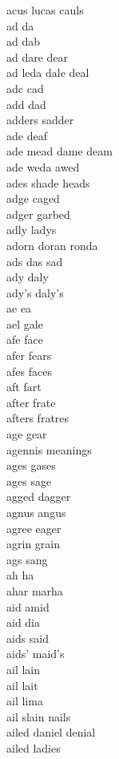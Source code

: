 acus lucas cauls \\
ad da\\
ad dab \\
ad dare dear  \\
ad leda dale deal  \\
adc cad\\
add dad\\
adders sadder\\
ade deaf \\
ade mead dame deam \\
ade weda awed \\
ades shade heads \\
adge caged \\
adger garbed \\
adly ladys \\
adorn doran ronda\\
ads das sad\\
ady daly \\
ady's daly's \\
ae ea\\
ael gale \\
afe face \\
afer fears \\
afes faces \\
aft fart \\
after frate\\
afters fratres \\
age gear \\
agennis meanings \\
ages gases \\
ages sage\\
agged dagger \\
agnus angus\\
agree eager\\
agrin grain\\
ags sang \\
ah ha\\
ahar marha \\
aid amid \\
aid dia\\
aids said\\
aids' maid's \\
ail lain \\
ail lait \\
ail lima \\
ail slain nails  \\
ailed daniel denial \\
ailed ladies \\
